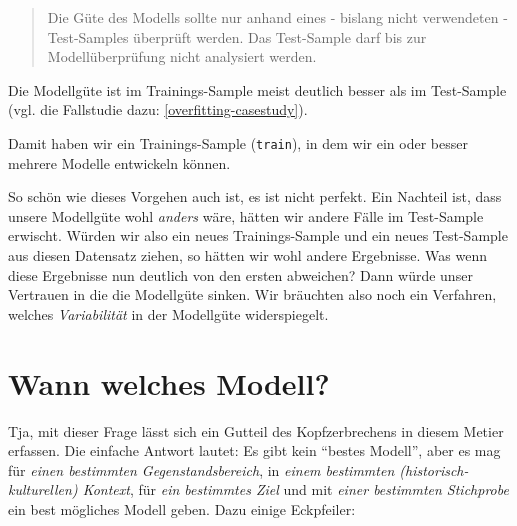 \documentclass[12pt,ngerman,]{book}
\newenvironment{Shaded}{\begin{snugshade}}{\end{snugshade}}
\newcommand{\KeywordTok}[1]{\textcolor[rgb]{0.13,0.29,0.53}{\textbf{{#1}}}}
\newcommand{\DataTypeTok}[1]{\textcolor[rgb]{0.13,0.29,0.53}{{#1}}}
\newcommand{\DecValTok}[1]{\textcolor[rgb]{0.00,0.00,0.81}{{#1}}}
\newcommand{\StringTok}[1]{\textcolor[rgb]{0.31,0.60,0.02}{{#1}}}
\newcommand{\CommentTok}[1]{\textcolor[rgb]{0.56,0.35,0.01}{\textit{{#1}}}}
\newcommand{\OtherTok}[1]{\textcolor[rgb]{0.56,0.35,0.01}{{#1}}}
\newcommand{\NormalTok}[1]{{#1}}
\renewenvironment{Shaded}{\begin{kframe}}{\end{kframe}}
\begin{document}
\begin{quote}
Die Güte des Modells sollte nur anhand eines - bislang nicht verwendeten
- Test-Samples überprüft werden. Das Test-Sample darf bis zur
Modellüberprüfung nicht analysiert werden.
\end{quote}

Die Modellgüte ist im Trainings-Sample meist deutlich besser als im
Test-Sample (vgl. die Fallstudie dazu: \ref{overfitting-casestudy}).

\begin{Shaded}
\end{Shaded}

Damit haben wir ein Trainings-Sample (\texttt{train}), in dem wir ein
oder besser mehrere Modelle entwickeln können.

So schön wie dieses Vorgehen auch ist, es ist nicht perfekt. Ein
Nachteil ist, dass unsere Modellgüte wohl \emph{anders} wäre, hätten wir
andere Fälle im Test-Sample erwischt. Würden wir also ein neues
Trainings-Sample und ein neues Test-Sample aus diesen Datensatz ziehen,
so hätten wir wohl andere Ergebnisse. Was wenn diese Ergebnisse nun
deutlich von den ersten abweichen? Dann würde unser Vertrauen in die die
Modellgüte sinken. Wir bräuchten also noch ein Verfahren, welches
\emph{Variabilität} in der Modellgüte widerspiegelt.

\section{Wann welches Modell?}\label{wann-welches-modell}

Tja, mit dieser Frage lässt sich ein Gutteil des Kopfzerbrechens in
diesem Metier erfassen. Die einfache Antwort lautet: Es gibt kein
``bestes Modell'', aber es mag für \emph{einen bestimmten
Gegenstandsbereich}, in \emph{einem bestimmten (historisch-kulturellen)
Kontext}, für \emph{ein bestimmtes Ziel} und mit \emph{einer bestimmten
Stichprobe} ein best mögliches Modell geben. Dazu einige Eckpfeiler:
\end{document}
